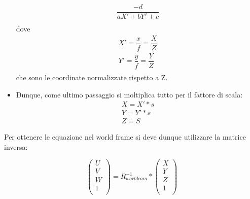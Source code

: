 \begin{itemize}
		\begin{equation}
		\begin{split}
		\dfrac{-d}{aX'+bY'+c}\\	
		\end{split}
		\end{equation}
	dove
		\begin{equation}
		\begin{split}
		X'=\dfrac{x}{f}=\dfrac{X}{Z}\\
		Y'=\dfrac{y}{f}=\dfrac{Y}{Z} \\
		\end{split}
		\end{equation}
	che sono le coordinate normalizzate rispetto a Z.
	\item \textbf{}
	Dunque, come ultimo passaggio si moltiplica tutto per il fattore di scala:
		\begin{equation}
		\begin{split}
		X=X'*s\\
		Y=Y'*s\\
		Z=S
		\end{split}
		\end{equation}
	
\end{itemize}

Per ottenere le equazione nel world frame si deve dunque utilizzare la matrice inversa:

$$
\begin{pmatrix}
U  \\
V  \\
W  \\
1  \\
\end{pmatrix}
=R_{worldcam}^{-1}*
\begin{pmatrix}
X  \\
Y  \\
Z  \\
1  \\
\end{pmatrix}
$$

